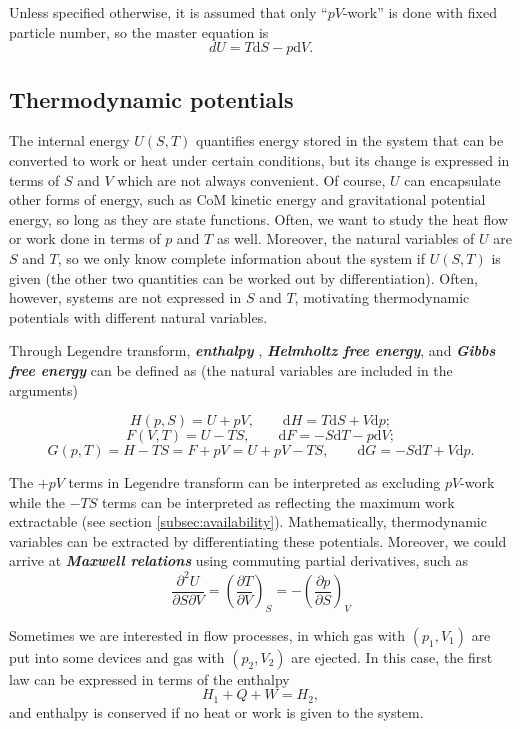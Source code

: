 \documentclass{article}
\theoremstyle{nonumberplain}
\begin{document}
Unless specified otherwise, it is assumed that only ``$pV$-work'' is done with fixed particle number, so the master equation is 
\[
    \boxed{dU = T \mathrm{d} S - p \mathrm{d} V.} 
\]
\subsection{Thermodynamic potentials}
The internal energy $U(S,T)$ quantifies energy stored in the system that can be converted to work or heat under certain conditions, but its change is expressed in terms of $S$ and $V$ which are not always convenient. Of course, $U$ can encapsulate other forms of energy, such as CoM kinetic energy and gravitational potential energy, so long as they are state functions. Often, we want to study the heat flow or work done in terms of $p$ and $T$ as well. Moreover, the natural variables of $U$ are $S$ and $T$, so we only know complete information about the system if $U(S,T)$ is given (the other two quantities can be worked out by differentiation). Often, however, systems are not expressed in $S$ and $T$, motivating thermodynamic potentials with different natural variables. 

Through Legendre transform, \textit{\textbf{enthalpy}} , \textit{\textbf{Helmholtz free energy}}, and \textit{\textbf{Gibbs free energy}} can be defined as (the natural variables are included in the arguments)

\[
    \boxed{
    H(p,S) = U + p V, \qquad \mathrm{d} H = T \mathrm{d} S + V \mathrm{d} p ;}
\]
\[
    \boxed{
    F(V,T) = U - TS, \qquad \mathrm{d} F = - S \mathrm{d} T - p \mathrm{d} V;}
\]
\[
    \boxed{
    G(p,T) = H - TS = F + p V = U + pV - TS, \qquad \mathrm{d} G = -S \mathrm{d} T + V \mathrm{d} p.}
\]

The $+pV$ terms in Legendre transform can be interpreted as excluding $pV$-work while the $-TS$ terms can be interpreted as reflecting the maximum work extractable (see section \ref{subsec:availability}). Mathematically, thermodynamic variables can be extracted by differentiating these potentials. Moreover, we could arrive at \textit{\textbf{Maxwell relations}} using commuting partial derivatives, such as 
\[
    \frac{\partial ^{2} U}{\partial S \partial V}  = 
    \left( \frac{\partial T}{\partial V} \right)_{S} = 
    -\left( \frac{\partial p}{\partial S} \right)_{V} 
\] 

Sometimes we are interested in flow processes, in which gas with $(p_1, V_1)$ are put into some devices and gas with $(p_2, V_2)$ are ejected. In this case, the first law can be expressed in terms of the enthalpy
\[
    \boxed{H_1 + Q + W = H_2,}
\]
and enthalpy is conserved if no heat or work is given to the system. 
\end{document}
